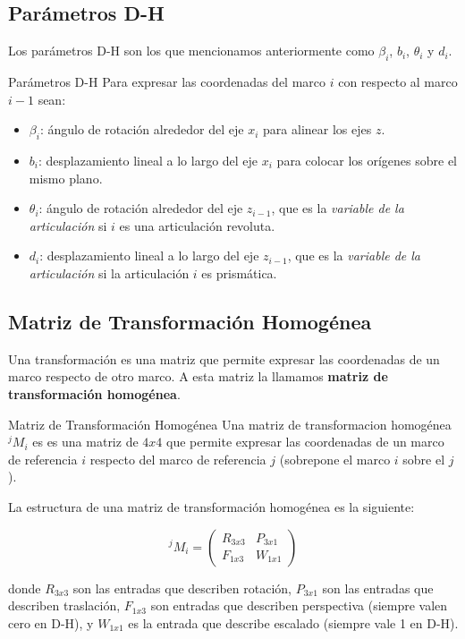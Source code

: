 \subsection{Parámetros D-H}
Los parámetros D-H son los que mencionamos anteriormente como $\beta_i$, $b_i$, $\theta_i$ y $d_i$.

\begin{miDefinicion}{Parámetros D-H}
    Para expresar las coordenadas del marco $i$ con respecto al marco $i-1$ sean:
    \begin{itemize}
        \item $\beta_i$: ángulo de rotación alrededor del eje $x_i$ para alinear los ejes $z$.
        \item $b_i$: desplazamiento lineal a lo largo del eje $x_i$ para colocar los orígenes sobre el mismo plano. 
        \item $\theta_i$: ángulo de rotación alrededor del eje $z_{i-1}$, que es la \textit{variable de la articulación} si $i$ es una articulación revoluta. 
        \item $d_i$: desplazamiento lineal a lo largo del eje $z_{i-1}$, que es la \textit{variable de la articulación} si la articulación $i$ es prismática. 
    \end{itemize}
\end{miDefinicion}

\subsection{Matriz de Transformación Homogénea}
Una transformación es una matriz que permite expresar las coordenadas de un marco respecto de otro marco. A esta matriz la llamamos \textbf{matriz de transformación homogénea}.

\begin{miDefinicion}{Matriz de Transformación Homogénea}
    Una matriz de transformacion homogénea ${}^jM_i$ es es una matriz de $4x4$ que permite expresar las coordenadas de un marco de referencia $i$ respecto del marco de referencia $j$ (sobrepone el marco $i$ sobre el $j$). 

    La estructura de una matriz de transformación homogénea es la siguiente:

    \begin{equation*}
        {}^jM_i = \begin{pmatrix}
                    R_{3x3} & P_{3x1} \\
                    F_{1x3} & W_{1x1} 
                    \end{pmatrix}
    \end{equation*}

    donde $R_{3x3}$ son las entradas que describen rotación, $P_{3x1}$ son las entradas que describen traslación, $F_{1x3}$ son entradas que describen perspectiva (siempre valen cero en D-H), y $W_{1x1}$ es la entrada que describe escalado (siempre vale 1 en D-H). 
\end{miDefinicion}


